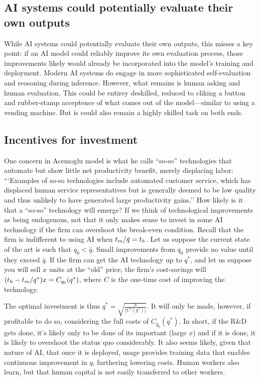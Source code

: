 \documentclass{article}
\theoremstyle{plain}
\theoremstyle{plain}
\begin{document}
\subsection{AI systems could potentially evaluate their own outputs}
While AI systems could potentially evaluate their own outputs, this misses a key point: if an AI model could reliably improve its own evaluation process, those improvements likely would already be incorporated into the model's training and deployment.
Modern AI systems do engage in more sophisticated self-evaluation and reasoning during inference. 
However, what remains is human asking and human evaluation.
This could be entirey deskilled, reduced to cliking a button and rubber-stamp acceptence of what comes out of the model---similar to using a vending machine.
But is could also remain a highly skilled task on both ends.

\subsection{Incentives for investment}
One concern in Acemoglu model is what he calls ``so-so'' technologies that automate but show little net productivity benefit, merely displacing labor: ```Examples of so-so technologies include automated customer service, which has displaced human service representatives but is generally deemed to be low quality and thus unlikely to have generated large productivity gains.''
How likely is it that a ``so-so'' technology will emerge?
If we think of technological improvements as being endogenous, not that it only makes sense to invest in some AI technology if the firm can overshoot the break-even condition. 
Recall that the firm is indifferent to using AI when $t_{m} / \bar{q} = t_{h}$. 
Let us suppose the current state of the art is such that $q_0 < \bar{q}$.
Small improvements from $q_0$ provide no value until they exceed $\bar{q}$. 
If the firm can get the AI technology up to $q^*$, and let us suppose you will sell $x$ units at the ``old'' price, 
the firm's cost-savings will $(t_{h} - t_{m} / q^*) x = C_{q_0}(q^*)$, where $C$ is the one-time cost of improving the technology.

The optimal investment is thus $q^* = \sqrt{\frac{x}{|C'(q^*)|}}$.
It will only be made, however, if profitable to do so, considering the full costs of $C_{q_0}(q^*)$.
In short, if the R\&D gets done, it's likely only to be done of its important (large $x$) and if it is done, it is likely to overshoot the status quo considerably.  
It also seems likely, given that nature of AI, that once it is deployed, usage provides training data that enables continuous improvement in $q$, furthering lowering costs. 
Human workers also learn, but that human capital is not easily transferred to other workers. 
\end{document}
